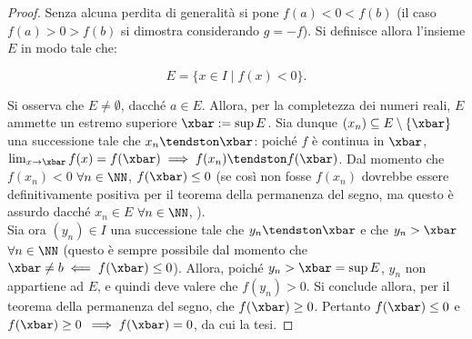 \documentclass[11pt]{article}
\begin{document}
	\begin{proof}
		Senza alcuna perdita di generalità si pone $f(a) < 0 < f(b)$ (il caso $f(a) > 0 > f(b)$ si dimostra
		considerando $g = -f$). Si definisce allora l'insieme $E$ in modo tale che:
		
		\[ E = \{ x \in I \mid f(x) < 0 \}. \]
		
		\vskip 0.05in
		
		Si osserva che $E \neq \emptyset$, dacché $a \in E$. Allora, per la completezza dei numeri reali,
		$E$ ammette un estremo superiore $\xbar := \sup E$. Sia dunque $(x_n) \subseteq E \setminus \{\xbar\}$ una successione
		tale che $x_n \tendston \xbar$: poiché $f$ è continua in $\xbar$, $\lim_{x \to \xbar} f(x) = f(\xbar) \implies
		f(x_n) \tendston f(\xbar)$. Dal momento che $f(x_n) < 0$ $\forall n \in \NN$, $f(\xbar) \leq 0$ (se così non fosse
		$f(x_n)$ dovrebbe essere definitivamente positiva per il teorema della permanenza del segno, ma questo
		è assurdo dacché $x_n \in E$ $\forall n \in \NN$, \Lightning). \\
		
		Sia ora $(y_n) \in I$ una successione tale che $y_n \tendston \xbar$ e che $y_n > \xbar$ $\forall n \in \NN$ (questo
		è sempre possibile dal momento che $\xbar \neq b \impliedby f(\xbar) \leq 0$). Allora,
		poiché $y_n > \xbar = \sup E$, $y_n$ non appartiene ad $E$, e quindi deve valere che $f(y_n) > 0$. Si conclude
		allora, per il teorema della permanenza del segno, che $f(\xbar) \geq 0$. Pertanto $f(\xbar) \leq 0$ e $f(\xbar) \geq 0$ $\implies f(\xbar) = 0$, da cui la tesi.
	\end{proof}
\end{document}
